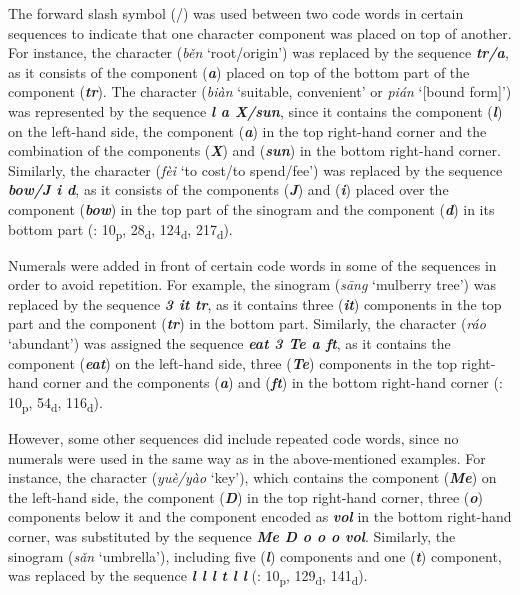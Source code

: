 \documentclass[output=paper,colorlinks,citecolor=brown,arabicfont,chinesefont]{langscibook}
\begin{document}
The forward slash symbol (/) was used between two code words in certain sequences to indicate that one character component was placed on top of another. For instance, the character {} (\emph{běn} ‘root/origin’) was replaced by the sequence \textbf{\emph{tr/a}}, as it consists of the component {} (\textbf{\emph{a}}) placed on top of the bottom part of the component {} (\textbf{\emph{tr}}). The character {} (\emph{biàn} ‘suitable, convenient’ or \emph{pián} ‘[bound form]’) was represented by the sequence \textbf{\emph{l a X/sun}}, since it contains the component {} (\textbf{\emph{l}}) on the left-hand side, the component {} (\textbf{\emph{a}}) in the top right-hand corner and the combination of the components {} (\textbf{\emph{X}}) and {} (\textbf{\emph{sun}}) in the bottom right-hand corner. Similarly, the character {} (\emph{fèi} ‘to cost/to spend/fee’) was replaced by the sequence \textbf{\emph{bow/J i d}}, as it consists of the components {} (\textbf{\emph{J}}) and {} (\textbf{\emph{i}}) placed over the component {} (\textbf{\emph{bow}}) in the top part of the sinogram and the component {} (\textbf{\emph{d}}) in its bottom part (\citealt{Wieluch1936}: 10\textsubscript{p}, 28\textsubscript{d}, 124\textsubscript{d}, 217\textsubscript{d}).

Numerals were added in front of certain code words in some of the sequences in order to avoid repetition. For example, the sinogram {} (\emph{sāng} ‘mulberry tree’) was replaced by the sequence \textbf{\emph{3 it tr}}, as it contains three {} (\textbf{\emph{it}}) components in the top part and the component {} (\textbf{\emph{tr}}) in the bottom part. Similarly, the character {} (\emph{ráo} ‘abundant’) was assigned the sequence \textbf{\emph{eat 3 Te a ft}}, as it contains the component {} (\textbf{\emph{eat}}) on the left-hand side, three {} (\textbf{\emph{Te}}) components in the top right-hand corner and the components {} (\textbf{\emph{a}}) and {} (\textbf{\emph{ft}}) in the bottom right-hand corner (\citealt{Wieluch1936}: 10\textsubscript{p}, 54\textsubscript{d}, 116\textsubscript{d}).

However, some other sequences did include repeated code words, since no numerals were used in the same way as in the above-mentioned examples. For instance, the character {} (\emph{yuè/yào} ‘key’), which contains the component {} (\textbf{\emph{Me}}) on the left-hand side, the component {} (\textbf{\emph{D}}) in the top right-hand corner, three {} (\textbf{\emph{o}}) components below it and the component encoded as \textbf{\emph{vol}} in the bottom right-hand corner, was substituted by the sequence  \textbf{\emph{Me D o o o vol}}. Similarly, the sinogram {} (\emph{sǎn} ‘umbrella’), including five {} (\textbf{\emph{l}}) components and one {} (\textbf{\emph{t}}) component, was replaced by the sequence \textbf{\emph{l l l t l l}} (\citealt{Wieluch1936}: 10\textsubscript{p}, 129\textsubscript{d}, 141\textsubscript{d}).
\end{document}
